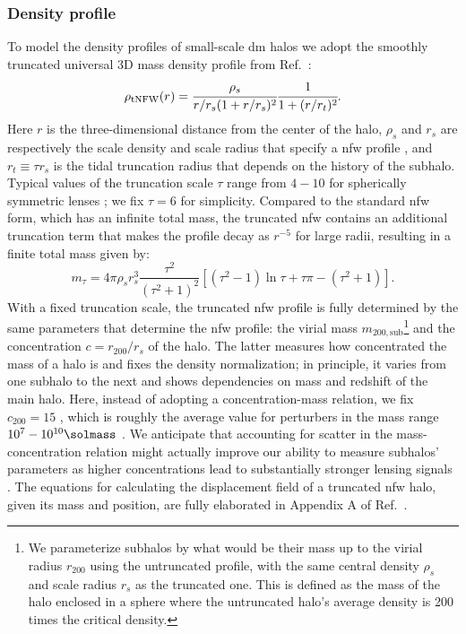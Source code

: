 \subsubsection{Density profile}
To model the density profiles of small-scale \gls*{dm} halos we adopt the smoothly truncated universal 3D mass density profile from Ref.~\cite{Baltz:2007vq}:
\begin{equation}
    \rho_{\mathrm{tNFW}}(r)= \cfrac{\rho_s}{r/r_s (1+r/r_s)^2}  \cfrac{1}{1+(r/r_t)^2}.
\end{equation}
Here $r$ is the three-dimensional distance from the center of the halo, $\rho_s$ and $r_s$ are respectively the scale density and scale radius that specify a \gls*{nfw} profile \cite{Navarro:1996gj}, and $r_t\equiv\tau r_s$ is the tidal truncation radius that depends on the history of the subhalo. Typical values of the truncation scale $\tau$ range from $4-10$ for spherically symmetric lenses \cite{Gilman:2019nap, Cyr-Racine:2019aa}; we fix $\tau=6$ for simplicity. 
Compared to the standard \gls*{nfw} form, which has an infinite total mass, the truncated \gls*{nfw} contains an additional truncation term that makes the profile decay as $r^{-5}$ for large radii, resulting in a finite total mass given by:
\begin{equation}
    m_\tau=4\pi \rho_s r_s^3 \frac{\tau^2}{(\tau^2+1)^2}[(\tau^2-1)\ln\tau+\tau\pi-(\tau^2 +1)].
\end{equation}
With a fixed truncation scale, the truncated \gls*{nfw} profile is fully determined by the same parameters that determine the \gls*{nfw} profile: the virial mass $m_\mathrm{200, sub}$\footnote{We parameterize subhalos by what would be their mass up to the virial radius $r_{200}$ using the untruncated profile, with the same central density $\rho_s$ and scale radius $r_s$ as the truncated one. This is defined as the mass of the halo enclosed in a sphere where the untruncated halo's average density is 200 times the critical density.} and the concentration $c=r_{200}/r_s$ of the halo. The latter measures how concentrated the mass of a halo is and fixes the density normalization; in principle, it varies from one subhalo to the next and shows dependencies on mass and redshift of the main halo. Here, instead of adopting a concentration-mass relation, we fix $c_{200}=15$ , which is roughly the average value for perturbers in the mass range $10^7-10^{10}\si{\solmass}$ \cite[Figure 7]{Richings:2020auv}. We anticipate that accounting for scatter in the mass-concentration relation might actually improve our ability to measure subhalos’ parameters as higher concentrations lead to substantially stronger lensing signals \cite{Amorisco:2021iim}.
The equations for calculating the displacement field of a truncated \gls*{nfw} halo, given its mass and position, are fully elaborated in Appendix A of Ref.~\cite{Baltz:2007vq}.

